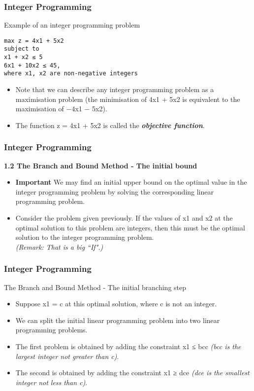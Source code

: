\documentclass{beamer}
\begin{document}
\begin{frame}[fragile]
\frametitle{Integer Programming}     


Example of an integer programming problem
\begin{verbatim}
max z = 4x1 + 5x2
subject to
x1 + x2 ≤ 5
6x1 + 10x2 ≤ 45,
where x1, x2 are non-negative integers
\end{verbatim}
\begin{itemize}
	\item Note that we can describe any integer programming problem as a
	maximisation problem (the minimisation of 4x1 + 5x2 is equivalent
	to the maximisation of −4x1 − 5x2). 
	\item The function z = 4x1 + 5x2 is
	called the \textbf{\textit{objective function}}. 
\end{itemize}

\end{frame}  
\begin{frame} 
\frametitle{Integer Programming}     
\noindent \textbf{1.2 The Branch and Bound Method - The initial bound}
\begin{itemize}
\item 
\textbf{Important} We may find an initial upper bound on the optimal value in the
integer programming problem by solving the corresponding linear
programming problem.
\item Consider the problem given previously. If the values of x1 and x2 at the
optimal solution to this problem are integers, then this must be the
optimal solution to the integer programming problem.\\
\textit{(Remark: That is a big ``If".)}
\end{itemize}
\end{frame}  
\begin{frame} 
\frametitle{Integer Programming}     
The Branch and Bound Method - The initial branching
step
\begin{itemize}
	\item Suppose x1 = c at this optimal solution, where c is not an integer.
	\item We can split the initial linear programming problem into two linear
	programming problems.
	\item The first problem is obtained by adding the constraint x1 ≤ bcc
	\textit{(bcc is the largest integer not greater than c)}.
	\item The second is obtained by adding the constraint x1 ≥ dce \textit{(dce is
	the smallest integer not less than c)}.
\end{itemize}
\end{frame}  
\end{document}
